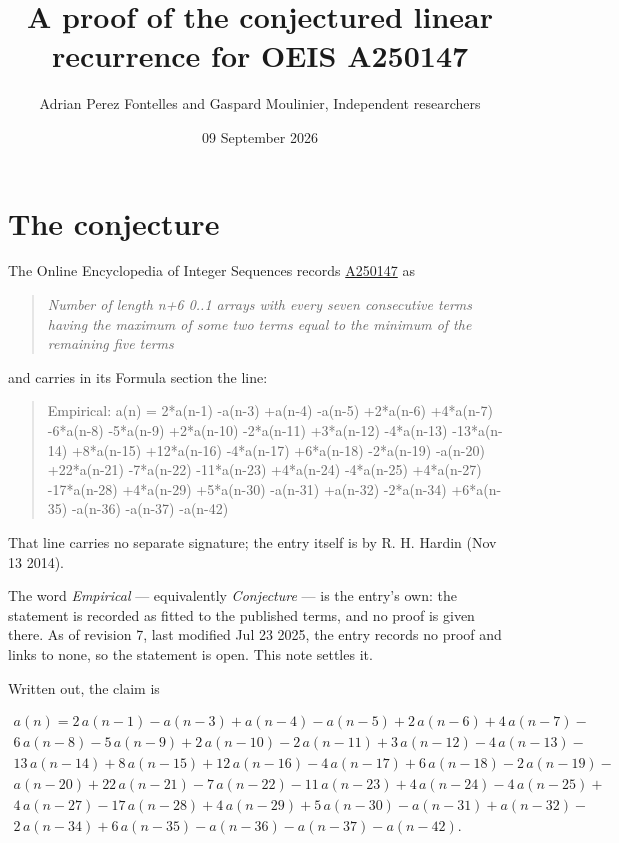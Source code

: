 \documentclass[11pt]{article}
\title{A proof of the conjectured linear recurrence for OEIS A250147}
\author{Adrian Perez Fontelles and Gaspard Moulinier, Independent researchers}
\date{09 September 2026}
\theoremstyle{definition}
\begin{document}
\maketitle
\section{The conjecture}

The Online Encyclopedia of Integer Sequences records \href{https://oeis.org/A250147}{A250147} as

\begin{quote}\itshape Number of length n+6 0..1 arrays with every seven consecutive terms having the maximum of some two terms equal to the minimum of the remaining five terms\end{quote}

and carries in its Formula section the line:

\begin{quote}\ttfamily Empirical: a(n) = 2*a(n-1) -a(n-3) +a(n-4) -a(n-5) +2*a(n-6) +4*a(n-7) -6*a(n-8) -5*a(n-9) +2*a(n-10) -2*a(n-11) +3*a(n-12) -4*a(n-13) -13*a(n-14) +8*a(n-15) +12*a(n-16) -4*a(n-17) +6*a(n-18) -2*a(n-19) -a(n-20) +22*a(n-21) -7*a(n-22) -11*a(n-23) +4*a(n-24) -4*a(n-25) +4*a(n-27) -17*a(n-28) +4*a(n-29) +5*a(n-30) -a(n-31) +a(n-32) -2*a(n-34) +6*a(n-35) -a(n-36) -a(n-37) -a(n-42)\end{quote}

That line carries no separate signature; the entry itself is by R. H. Hardin (Nov 13 2014).

The word {\itshape Empirical} --- equivalently {\itshape Conjecture} --- is the entry's own: the statement is recorded as fitted to the published terms, and no proof is given there. As of revision 7, last modified Jul 23 2025, the entry records no proof and links to none, so the statement is open. This note settles it.

Written out, the claim is

\begin{multline*} a(n) = 2\,a(n-1) - a(n-3) + a(n-4) - a(n-5) + 2\,a(n-6) + 4\,a(n-7) - \\ 6\,a(n-8) - 5\,a(n-9) + 2\,a(n-10) - 2\,a(n-11) + 3\,a(n-12) - 4\,a(n-13) - \\ 13\,a(n-14) + 8\,a(n-15) + 12\,a(n-16) - 4\,a(n-17) + 6\,a(n-18) - 2\,a(n-19) - \\ a(n-20) + 22\,a(n-21) - 7\,a(n-22) - 11\,a(n-23) + 4\,a(n-24) - 4\,a(n-25) + \\ 4\,a(n-27) - 17\,a(n-28) + 4\,a(n-29) + 5\,a(n-30) - a(n-31) + a(n-32) - \\ 2\,a(n-34) + 6\,a(n-35) - a(n-36) - a(n-37) - a(n-42). \end{multline*}
\end{document}
